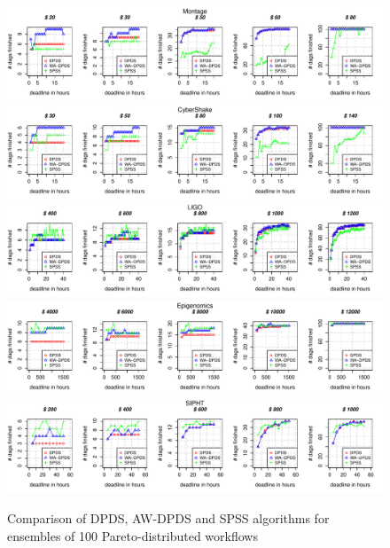 \documentclass{sig-alternate}
\begin{document}
\begin{figure}[htb] 
\centering
\includegraphics[width=1.0\textwidth]{figures/MONTAGE-n-1000-8-dagh1-20m0.pdf}
\includegraphics[width=1.0\textwidth]{figures/CYBERSHAKE-n-1000-8-dagh1-20m0.pdf}
\includegraphics[width=1.0\textwidth]{figures/LIGO-n-1000-8-dagh1-40m0.pdf}
\includegraphics[width=1.0\textwidth]{figures/GENOME-n-1000-8-dagh100-1500m0.pdf}
\includegraphics[width=1.0\textwidth]{figures/SIPHT-n-1000-8-dagh5-50m0.pdf}
\caption{Comparison of DPDS, AW-DPDS and SPSS algorithms for ensembles of 100
Pareto-distributed workflows}
\label{fig:}
\end{figure}
\end{document}

